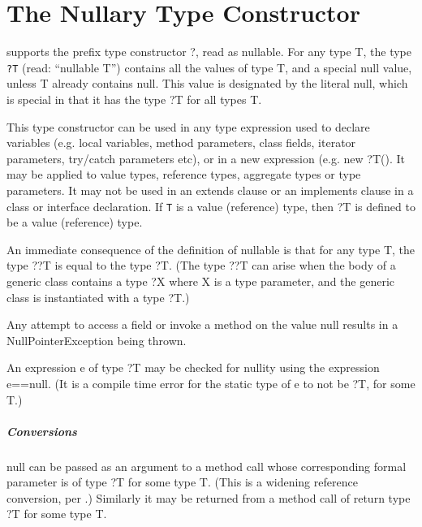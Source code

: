 \chapter{The Nullary Type Constructor}
\label{NullaryTypeConstructor}

\Xten{} supports the prefix type constructor {\cf ?}, read as {\cf nullable}. 
For any type {\cf T}, the type {\tt ?T} (read: ``{\cf nullable T}'')
contains all the values of type {\cf T}, and a special {\cf null} value,
unless {\cf T} already contains {\cf null}. This value is designated by
the literal {\cf null}, which is special in that it has the type
{\cf ?T} for all types {\cf T}.

This type constructor can be used in any type expression used to
declare variables (e.g.{} local variable{s}, method parameter{s},
class field{s}, iterator parameter{s}, try/catch parameter{s} etc), or in
a new expression (e.g. {\cf new ?T()}. It may be applied to
value types, reference types, aggregate types or
type parameters. It may not be used in an {\cf extends} clause or an
{\cf implements} clause in a class or interface declaration. If
{\tt T}  is a value (reference) type, then {\cf ?T} is defined to be a
value (reference) type.

An immediate consequence of the definition of {\cf nullable} is that
for any type {\cf T}, the type {\cf ??T} is equal to the type {\cf
?T}. (The type {\cf ??T} can arise when the body of a generic class
contains a type {\cf ?X} where {\cf X} is a type parameter, and the
generic class is instantiated with a type {\cf ?T}.)

Any attempt to access a field or invoke a method on the value {\cf
null} results in a {\cf NullPointerException} being thrown.

An expression {\cf e} of type {\cf ?T} may be checked for nullity using the expression {\cf e==null}. (It is a compile time error for the static type of 
{\cf e} to not be {\cf ?T}, for some {\cf T}.)

\paragraph{Conversions}
{\cf null} can be passed as an argument to a method call whose
corresponding formal parameter is of type {\cf ?T} for some type
{\cf T}. (This is a widening reference conversion, per \cite[Sec
5.1.4]{jls2}.) Similarly it may be returned from a method call of
return type {\cf ?T} for some type {\cf T}.

